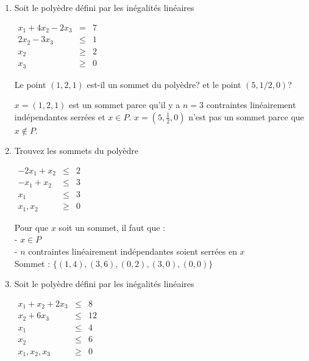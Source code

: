 \begin{enumerate}




  \item Soit le poly\`edre défini par les inégalités linéaires

    $
    \begin{array}{rcr}
      x_1+4 x_2-2x_3 & = & 7\\
      2x_2 -3x_3 & \leq & 1\\
      x_2 & \geq & 2\\
      x_3& \geq & 0
    \end{array}
    $

    Le point $(1, 2, 1)$ est-il un sommet du poly\`edre? et le point $(5, 1/2, 0)$?


    \begin{solution}
      $x = (1,2,1)$ est un sommet parce qu'il y a $n = 3$ contraintes linéairement indépendantes serrées et $x \in P$. $x = (5,\frac{1}{2},0)$ n'est pas un sommet parce que $x \not\in P$.
    \end{solution}


  \item Trouvez les sommets du poly\`edre

    $
    \begin{array}{rcr}
      -2x_1+x_2 & \leq & 2\\
      -x_1+x_2  & \leq & 3\\
      x_1 & \leq & 3\\
      x_1, x_2 & \geq & 0
    \end{array}
    $


    \begin{solution}
      Pour que $x$ soit un sommet, il faut que : \\
      - $x \in P$\\
      - $n$ contraintes linéairement indépendantes soient serrées en $x$ \\
      \newline
      Sommet : $\lbrace(1,4), (3,6), (0,2), (3,0), (0,0)\rbrace$
    \end{solution}

  \item Soit le poly\`edre défini par les inégalités linéaires

    $
    \begin{array}{rcr}
      x_1+x_2+2x_3 & \leq & 8\\
      x_2 + 6x_3 & \leq & 12\\
      x_1 & \leq & 4\\
      x_2 & \leq & 6\\
      x_1, x_2, x_3 & \geq & 0
    \end{array}
    $


\end{enumerate}
